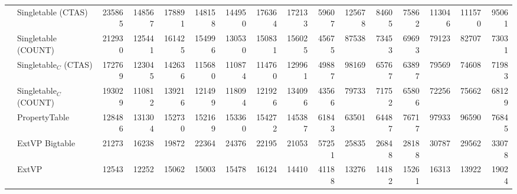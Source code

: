 \documentclass[
  a4paper,
  twocolumn
]{scrartcl}
\begin{document}
\begin{sidewaystable*}[htbp]
\begin{tabular*}{\textwidth}{ @{\extracolsep{\fill}} llrrrrrr|r|rrrrrr|r }
		& Singletable (CTAS) & 235865 & 148567 & 178891 & 148158 & 144950 & 176364 & 172133 & 59607 & 125678 & 84605 & 75862 & 113046 & 111570 & 95061 \\ 
		& Singletable (COUNT) & 212930 & 125441 & 161425 & 154996 & 130530 & 150831 & 156025 & 45675 & 87538 & 73453 & 69693 & 79123 & 82707 & 73031 \\ 
		& Singletable$_C$ (CTAS) & 172769 & 123045 & 142636 & 115680 & 110874 & 114760 & 129961 & 49887 & 98169 & 65767 & 63897 & 79569 & 74608 & 71983 \\ 
		& Singletable$_C$ (COUNT) & 193029 & 110812 & 139216 & 121499 & 118094 & 121926 & 134096 & 43566 & 79733 & 71752 & 65806 & 72256 & 75662 & 68129 \\ 
		& PropertyTable & 128486 & 131304 & 152730 & 152169 & 153360 & 154272 & 145387 & 61843 & 63501 & 64487 & 76717 & 97933 & 96590 & 76845 \\ 
		& ExtVP Bigtable & 21273 & 16238 & 19872 & 22364 & 24376 & 22195 & 21053 & 57251 & 25835 & 26848 & 28188 & 30787 & 29562 & 33078 \\ 
		& ExtVP & 12543 & 12252 & 15062 & 15003 & 15478 & 16124 & 14410 & 41188 & 13276 & 14182 & 15261 & 16313 & 13922 & 19024
  	\end{tabular*}


\end{sidewaystable*}
\end{document}
